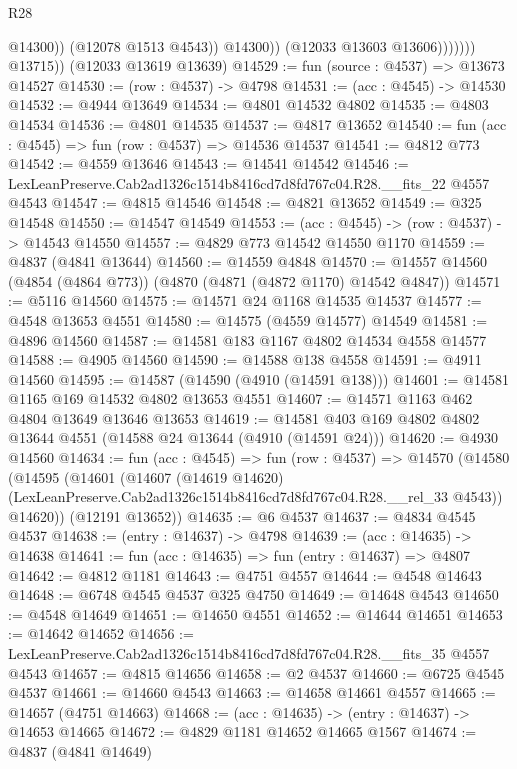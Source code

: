 \begin{lexlean}{R28}
\begin{coremodule}
                              @14300))
                          (@12078 @1513 @4543))
                        @14300))
                    (@12033 @13603 @13606)))))))
        @13715))
    (@12033 @13619 @13639)
@14529 := fun (source : @4537) => @13673 @14527
@14530 := (row : @4537) -> @4798
@14531 := (acc : @4545) -> @14530
@14532 := @4944 @13649
@14534 := @4801 @14532 @4802
@14535 := @4803 @14534
@14536 := @4801 @14535
@14537 := @4817 @13652
@14540 := fun (acc : @4545) => fun (row : @4537) => @14536 @14537
@14541 := @4812 @773
@14542 := @4559 @13646
@14543 := @14541 @14542
@14546 := LexLeanPreserve.Cab2ad1326c1514b8416cd7d8fd767c04.R28.__fits_22 @4557 @4543
@14547 := @4815 @14546
@14548 := @4821 @13652
@14549 := @325 @14548
@14550 := @14547 @14549
@14553 := (acc : @4545) -> (row : @4537) -> @14543 @14550
@14557 := @4829 @773 @14542 @14550 @1170
@14559 := @4837 (@4841 @13644)
@14560 := @14559 @4848
@14570 := @14557 @14560 (@4854 (@4864 @773)) (@4870 (@4871 (@4872 @1170) @14542 @4847))
@14571 := @5116 @14560
@14575 := @14571 @24 @1168 @14535 @14537
@14577 := @4548 @13653 @4551
@14580 := @14575 (@4559 @14577) @14549
@14581 := @4896 @14560
@14587 := @14581 @183 @1167 @4802 @14534 @4558 @14577
@14588 := @4905 @14560
@14590 := @14588 @138 @4558
@14591 := @4911 @14560
@14595 := @14587 (@14590 (@4910 (@14591 @138)))
@14601 := @14581 @1165 @169 @14532 @4802 @13653 @4551
@14607 := @14571 @1163 @462 @4804 @13649 @13646 @13653
@14619 := @14581 @403 @169 @4802 @4802 @13644 @4551 (@14588 @24 @13644 (@4910 (@14591 @24)))
@14620 := @4930 @14560
@14634 := fun (acc : @4545) =>
  fun (row : @4537) =>
  @14570
    (@14580
      (@14595
        (@14601
          (@14607
            (@14619 @14620)
            (LexLeanPreserve.Cab2ad1326c1514b8416cd7d8fd767c04.R28.__rel_33 @4543))
          @14620))
      (@12191 @13652))
@14635 := @6 @4537
@14637 := @4834 @4545 @4537
@14638 := (entry : @14637) -> @4798
@14639 := (acc : @14635) -> @14638
@14641 := fun (acc : @14635) => fun (entry : @14637) => @4807
@14642 := @4812 @1181
@14643 := @4751 @4557
@14644 := @4548 @14643
@14648 := @6748 @4545 @4537 @325 @4750
@14649 := @14648 @4543
@14650 := @4548 @14649
@14651 := @14650 @4551
@14652 := @14644 @14651
@14653 := @14642 @14652
@14656 := LexLeanPreserve.Cab2ad1326c1514b8416cd7d8fd767c04.R28.__fits_35 @4557 @4543
@14657 := @4815 @14656
@14658 := @2 @4537
@14660 := @6725 @4545 @4537
@14661 := @14660 @4543
@14663 := @14658 @14661 @4557
@14665 := @14657 (@4751 @14663)
@14668 := (acc : @14635) -> (entry : @14637) -> @14653 @14665
@14672 := @4829 @1181 @14652 @14665 @1567
@14674 := @4837 (@4841 @14649)

\end{coremodule}
\end{lexlean}

